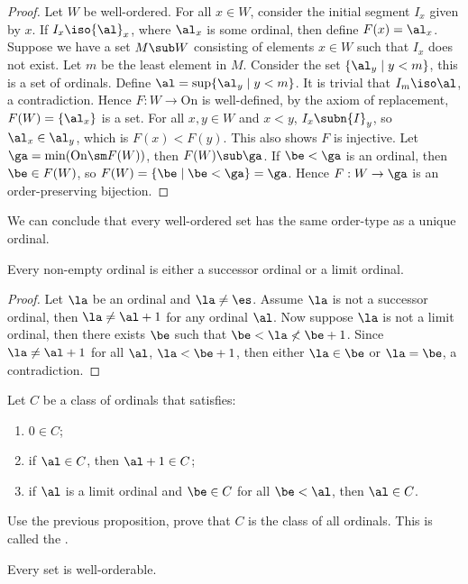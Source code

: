 \documentclass[10pt]{article}
\begin{document}
\begin{proof}
    Let $W$ be well-ordered. For all $x\in W$, consider the initial segment ${I}_{x}$ given by $x$. If ${I}_{x}\iso{\al}_{x}$, where ${\al}_{x}$ is some ordinal, then define $F(x)={\al}_{x}$. Suppose we have a set $M\sub W$ consisting of elements $x\in W$ such that ${I}_{x}$ does not exist. Let $m$ be the least element in $M$. Consider the set $\{{\al}_{y}\mid y<m\}$, this is a set of ordinals. Define $\al=\sup\{{\al}_{y}\mid y<m\}$. It is trivial that ${I}_{m}\iso\al$, a contradiction. Hence $F:W\to\text{On}$ is well-defined, by the axiom of replacement, $F(W)=\{{\al}_{x}\}$ is a set. For all $x,y\in W$ and $x<y$, ${I}_{x}\subn{I}_{y}$, so ${\al}_{x}\in{\al}_{y}$, which is $F(x)<F(y)$. This also shows $F$ is injective. Let $\ga=\min(\text{On}\sm F(W))$, then $F(W)\sub\ga$. If $\be<\ga$ is an ordinal, then $\be\in F(W)$, so $F(W)=\{\be\mid\be<\ga\}=\ga$. Hence $F:W\to\ga$ is an order-preserving bijection.
\end{proof}
\par
We can conclude that every well-ordered set has the same order-type as a unique ordinal.
\begin{proposition}
    Every non-empty ordinal is either a successor ordinal or a limit ordinal.
\end{proposition}
\begin{proof}
    Let $\la$ be an ordinal and $\la\ne\es$. Assume $\la$ is not a successor ordinal, then $\la\ne\al+1$ for any ordinal $\al$. Now suppose $\la$ is not a limit ordinal, then there exists $\be$ such that $\be<\la\nless\be+1$. Since $\la\ne\al+1$ for all $\al$, $\la<\be+1$, then either $\la\in\be$ or $\la=\be$, a contradiction.
\end{proof}
\begin{problem}
    Let $C$ be a class of ordinals that satisfies:
    \begin{enumerate}
        \item $0\in C$;
        \item if $\al\in C$, then $\al+1\in C$;
        \item if $\al$ is a limit ordinal and $\be\in C$ for all $\be<\al$, then $\al\in C$.
    \end{enumerate}
    Use the previous proposition, prove that $C$ is the class of all ordinals. This is called the .
\end{problem}
\begin{theorem}
    Every set is well-orderable.
\end{theorem}
\end{document}

